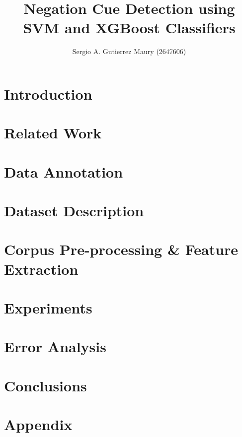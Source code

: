 \documentclass[runningheads]{llncs}
\begin{document}
%
\title{Negation Cue Detection using SVM and XGBoost Classifiers}
%
%
\author{
Sergio A. Gutierrez Maury (2647606)
}
%
%
%
\maketitle              %

\begin{abstract}

\end{abstract}
\section{Introduction}

\section{Related Work \label{sec:relatedwork}}

\section{Data Annotation}

\section{Dataset Description}

\section{Corpus Pre-processing \& Feature Extraction \label{sec:featEx}}

\section{Experiments}

\section{Error Analysis \label{sec:error}}

\section{Conclusions}

\newpage
\printbibliography


\appendix
\section{Appendix}

\end{document}
